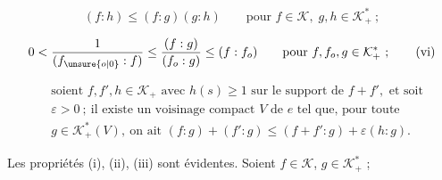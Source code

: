 \[
(f:h)\leq(f:g)(g:h)\qquad\text{pour }f\in\mathcal{K},\;g,h\in\mathcal{K}_+^*\ ; \tag*{(v)}
\]

\[
0<\frac{1}{(f_{\unsure{o|0}}:f)}\leq\frac{(f:g)}{(f_o:g)}\leq(f:f_o)\qquad\text{pour }f,f_o,g\in\mathcal{K}_+^*\ ; \tag*{(vi)}
\]

\[
\begin{aligned}
&\text{soient } f,f',h\in\mathcal{K}_+\text{ avec }h(s)\geq1\text{ sur le support de }f+f',\text{ et soit}\\
&\varepsilon>0\ ;\ \text{il existe un voisinage compact }V\text{ de }e\text{ tel que, pour toute}\\
&g\in\mathcal{K}_+^*(V),\ \text{on ait }(f:g)+(f':g)\leq(f+f':g)+\varepsilon(h:g).
\end{aligned} \tag*{(vii)}
\]

Les propriétés (i), (ii), (iii) sont évidentes. Soient $f\in\mathcal{K}$, $g\in\mathcal{K}_+^*$ ;
